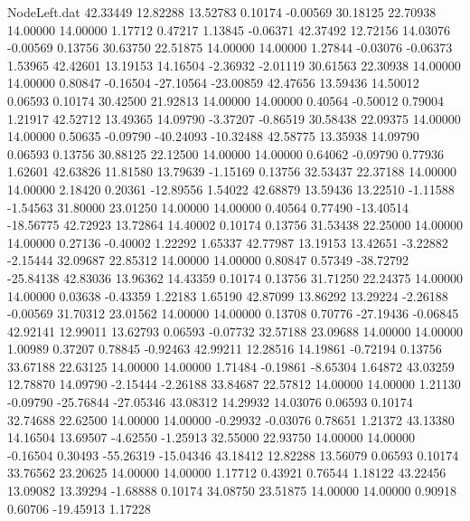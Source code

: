 \begin{filecontents}{NodeLeft.dat}
  42.33449   12.82288   13.52783     0.10174   -0.00569   30.18125   22.70938   14.00000   14.00000    1.17712    0.47217    1.13845   -0.06371
  42.37492   12.72156   14.03076    -0.00569    0.13756   30.63750   22.51875   14.00000   14.00000    1.27844   -0.03076   -0.06373    1.53965
  42.42601   13.19153   14.16504    -2.36932   -2.01119   30.61563   22.30938   14.00000   14.00000    0.80847   -0.16504  -27.10564  -23.00859
  42.47656   13.59436   14.50012     0.06593    0.10174   30.42500   21.92813   14.00000   14.00000    0.40564   -0.50012    0.79004    1.21917
  42.52712   13.49365   14.09790    -3.37207   -0.86519   30.58438   22.09375   14.00000   14.00000    0.50635   -0.09790  -40.24093  -10.32488
  42.58775   13.35938   14.09790     0.06593    0.13756   30.88125   22.12500   14.00000   14.00000    0.64062   -0.09790    0.77936    1.62601
  42.63826   11.81580   13.79639    -1.15169    0.13756   32.53437   22.37188   14.00000   14.00000    2.18420    0.20361  -12.89556    1.54022
  42.68879   13.59436   13.22510    -1.11588   -1.54563   31.80000   23.01250   14.00000   14.00000    0.40564    0.77490  -13.40514  -18.56775
  42.72923   13.72864   14.40002     0.10174    0.13756   31.53438   22.25000   14.00000   14.00000    0.27136   -0.40002    1.22292    1.65337
  42.77987   13.19153   13.42651    -3.22882   -2.15444   32.09687   22.85312   14.00000   14.00000    0.80847    0.57349  -38.72792  -25.84138
  42.83036   13.96362   14.43359     0.10174    0.13756   31.71250   22.24375   14.00000   14.00000    0.03638   -0.43359    1.22183    1.65190
  42.87099   13.86292   13.29224    -2.26188   -0.00569   31.70312   23.01562   14.00000   14.00000    0.13708    0.70776  -27.19436   -0.06845
  42.92141   12.99011   13.62793     0.06593   -0.07732   32.57188   23.09688   14.00000   14.00000    1.00989    0.37207    0.78845   -0.92463
  42.99211   12.28516   14.19861    -0.72194    0.13756   33.67188   22.63125   14.00000   14.00000    1.71484   -0.19861   -8.65304    1.64872
  43.03259   12.78870   14.09790    -2.15444   -2.26188   33.84687   22.57812   14.00000   14.00000    1.21130   -0.09790  -25.76844  -27.05346
  43.08312   14.29932   14.03076     0.06593    0.10174   32.74688   22.62500   14.00000   14.00000   -0.29932   -0.03076    0.78651    1.21372
  43.13380   14.16504   13.69507    -4.62550   -1.25913   32.55000   22.93750   14.00000   14.00000   -0.16504    0.30493  -55.26319  -15.04346
  43.18412   12.82288   13.56079     0.06593    0.10174   33.76562   23.20625   14.00000   14.00000    1.17712    0.43921    0.76544    1.18122
  43.22456   13.09082   13.39294    -1.68888    0.10174   34.08750   23.51875   14.00000   14.00000    0.90918    0.60706  -19.45913    1.17228

\end{filecontents}
